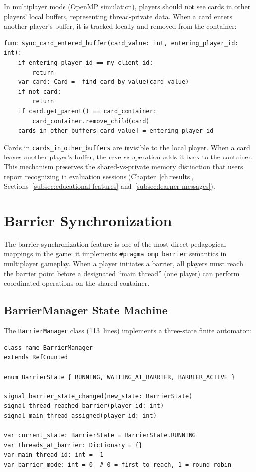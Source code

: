 In multiplayer mode (OpenMP simulation), players should not see cards in other players' local buffers, representing thread-private data. When a card enters another player's buffer, it is tracked locally and removed from the container:

\begin{lstlisting}[caption={Buffer entry notification (multiplayer\_card\_manager.gd)}]
func sync_card_entered_buffer(card_value: int, entering_player_id: int):
    if entering_player_id == my_client_id:
        return
    var card: Card = _find_card_by_value(card_value)
    if not card:
        return
    if card.get_parent() == card_container:
        card_container.remove_child(card)
    cards_in_other_buffers[card_value] = entering_player_id
\end{lstlisting}

Cards in \texttt{cards\_in\_other\_buffers} are invisible to the local player. When a card leaves another player's buffer, the reverse operation adds it back to the container. This mechanism preserves the shared-vs-private memory distinction that users report recognizing in evaluation sessions (Chapter~\ref{ch:results}, Sections~\ref{subsec:educational-features} and~\ref{subsec:learner-messages}).

\section{Barrier Synchronization}
\label{sec:barrier-implementation}

The barrier synchronization feature is one of the most direct pedagogical mappings in the game: it implements \texttt{\#pragma omp barrier} semantics in multiplayer gameplay. When a player initiates a barrier, all players must reach the barrier point before a designated ``main thread'' (one player) can perform coordinated operations on the shared container.

\subsection{BarrierManager State Machine}
\label{subsec:barrier-state-machine}

The \texttt{BarrierManager} class (113~lines) implements a three-state finite automaton:

\begin{lstlisting}[caption={BarrierManager state machine (barrier\_manager.gd)}]
class_name BarrierManager
extends RefCounted

enum BarrierState { RUNNING, WAITING_AT_BARRIER, BARRIER_ACTIVE }

signal barrier_state_changed(new_state: BarrierState)
signal thread_reached_barrier(player_id: int)
signal main_thread_assigned(player_id: int)

var current_state: BarrierState = BarrierState.RUNNING
var threads_at_barrier: Dictionary = {}
var main_thread_id: int = -1
var barrier_mode: int = 0  # 0 = first to reach, 1 = round-robin
\end{lstlisting}

